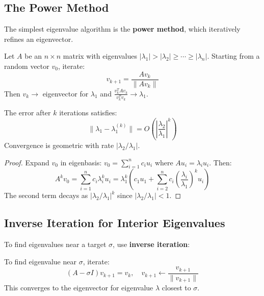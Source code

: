 \subsection{The Power Method}

The simplest eigenvalue algorithm is the \textbf{power method}, which iteratively refines an eigenvector.

\begin{defn}\label{def:power-method}
Let $A$ be an $n \times n$ matrix with eigenvalues $|\lambda_1| > |\lambda_2| \geq \cdots \geq |\lambda_n|$. Starting from a random vector $v_0$, iterate:
\begin{equation}
v_{k+1} = \frac{A v_k}{\|A v_k\|}
\end{equation}
Then $v_k \to$ eigenvector for $\lambda_1$ and $\frac{v_k^T A v_k}{v_k^T v_k} \to \lambda_1$.
\end{defn}

\begin{thm}\label{thm:power-convergence}
The error after $k$ iterations satisfies:
\begin{equation}
\|\lambda_1 - \lambda_1^{(k)}\| = O\left(\left|\frac{\lambda_2}{\lambda_1}\right|^k\right)
\end{equation}
Convergence is geometric with rate $|\lambda_2/\lambda_1|$.
\end{thm}

\begin{proof}
Expand $v_0$ in eigenbasis: $v_0 = \sum_{i=1}^n c_i u_i$ where $Au_i = \lambda_i u_i$. Then:
\begin{equation}
A^k v_0 = \sum_{i=1}^n c_i \lambda_i^k u_i = \lambda_1^k \left(c_1 u_1 + \sum_{i=2}^n c_i \left(\frac{\lambda_i}{\lambda_1}\right)^k u_i\right)
\end{equation}
The second term decays as $|\lambda_2/\lambda_1|^k$ since $|\lambda_2/\lambda_1| < 1$.
\end{proof}

\subsection{Inverse Iteration for Interior Eigenvalues}

To find eigenvalues near a target $\sigma$, use \textbf{inverse iteration}:

\begin{defn}\label{def:inverse-iteration}
To find eigenvalue near $\sigma$, iterate:
\begin{equation}
(A - \sigma I) v_{k+1} = v_k, \quad v_{k+1} \leftarrow \frac{v_{k+1}}{\|v_{k+1}\|}
\end{equation}
This converges to the eigenvector for eigenvalue $\lambda$ closest to $\sigma$.
\end{defn}

